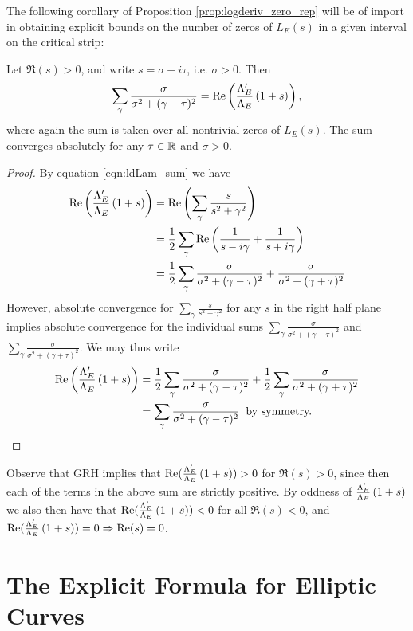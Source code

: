 The following corollary of Proposition \ref{prop:logderiv_zero_rep} will be of import in obtaining explicit bounds on the number of zeros of $L_E(s)$ in a given interval on the critical strip:
\begin{corollary}[GRH]\label{cor:Re_logderiv}
Let $\Re(s) > 0$, and write $s = \sigma + i\tau$, i.e. $\sigma > 0$. Then
\begin{equation}
\sum_{\gamma} \frac{\sigma}{\sigma^2+(\gamma-\tau)^2} = \mbox{\rm Re}\left(\frac{\Lambda_E^{\prime}}{\Lambda_E}\left(1+s\right)\right),
\end{equation}
where again the sum is taken over all nontrivial zeros of $L_E(s)$. The sum converges absolutely for any $\tau \in \mathbb{R}$ and $\sigma > 0$.
\end{corollary}
\begin{proof}
By equation \ref{eqn:ldLam_sum} we have
\begin{align*}
\mbox{\rm Re}\left(\frac{\Lambda_E^{\prime}}{\Lambda_E}\left(1+s\right)\right) &= \mbox{\rm Re}\left(\sum_{\gamma} \frac{s}{s^2+\gamma^2}\right) \\
& = \frac{1}{2} \sum_{\gamma} \mbox{\rm Re}\left(\frac{1}{s - i \gamma} + \frac{1}{s + i \gamma}\right) \\
&= \frac{1}{2} \sum_{\gamma} \frac{\sigma}{\sigma^2+(\gamma-\tau)^2} +  \frac{\sigma}{\sigma^2+(\gamma+\tau)^2}
\end{align*}
However, absolute convergence for $\sum_{\gamma} \frac{s}{s^2+\gamma^2}$ for any $s$ in the right half plane implies absolute convergence for the individual sums $\sum_{\gamma} \frac{\sigma}{\sigma^2+(\gamma-\tau)^2}$ and $\sum_{\gamma} \frac{\sigma}{\sigma^2+(\gamma+\tau)^2}$. We may thus write
\begin{align*}
\mbox{\rm Re}\left(\frac{\Lambda_E^{\prime}}{\Lambda_E}\left(1+s\right)\right) &= \frac{1}{2} \sum_{\gamma} \frac{\sigma}{\sigma^2+(\gamma-\tau)^2} +  \frac{1}{2} \sum_{\gamma}\frac{\sigma}{\sigma^2+(\gamma+\tau)^2} \\
&= \sum_{\gamma} \frac{\sigma}{\sigma^2+(\gamma-\tau)^2} \;\;\text{by symmetry.}
\end{align*}
\end{proof}
Observe that GRH implies that $\mbox{\rm Re}(\frac{\Lambda_E^{\prime}}{\Lambda_E}\left(1+s\right))>0$ for $\Re(s)>0$, since then each of the terms in the above sum are strictly positive. By oddness of $\frac{\Lambda_E^{\prime}}{\Lambda_E}\left(1+s\right)$ we also then have that $\mbox{\rm Re}(\frac{\Lambda_E^{\prime}}{\Lambda_E}\left(1+s\right))<0$ for all $\Re(s)<0$, and $\mbox{\rm Re}(\frac{\Lambda_E^{\prime}}{\Lambda_E}\left(1+s\right))=0 \Rightarrow \mbox{\rm Re}(s)=0$. \\

\newpage
\section{The Explicit Formula for Elliptic Curves}

